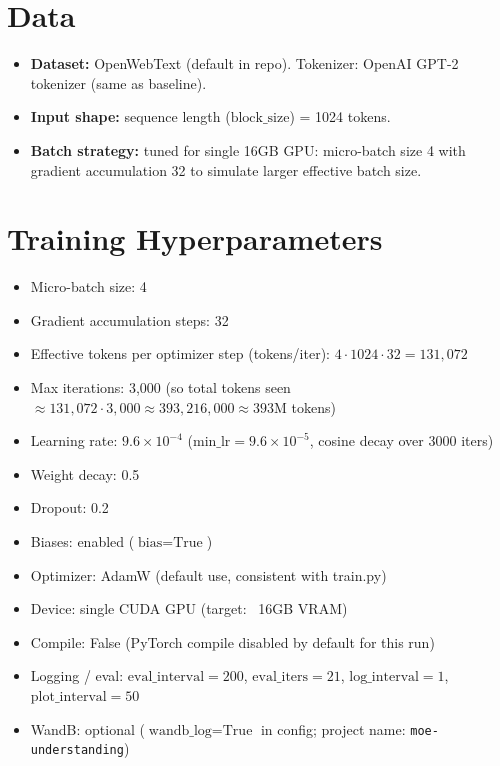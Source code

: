 \documentclass{article}
\begin{document}
\section{Data}
\begin{itemize}
    \item \textbf{Dataset:} OpenWebText (default in repo). Tokenizer: OpenAI GPT-2 tokenizer (same as baseline).
    \item \textbf{Input shape:} sequence length ($\text{block\_size}$) = 1024 tokens.
    \item \textbf{Batch strategy:} tuned for single 16GB GPU: micro-batch size 4 with gradient accumulation 32 to simulate larger effective batch size.
\end{itemize}

\section{Training Hyperparameters}
\begin{itemize}
    \item Micro-batch size: 4
    \item Gradient accumulation steps: 32
    \item Effective tokens per optimizer step (tokens/iter): $4 \cdot 1024 \cdot 32 = 131,072$
    \item Max iterations: 3,000 (so total tokens seen $\approx 131,072 \cdot 3,000 \approx 393,216,000 \approx 393$M tokens)
    \item Learning rate: $9.6 \times 10^{-4}$ ($\text{min\_lr} = 9.6 \times 10^{-5}$, cosine decay over 3000 iters)
    \item Weight decay: 0.5
    \item Dropout: 0.2
    \item Biases: enabled ($\text{bias}=\text{True}$)
    \item Optimizer: AdamW (default use, consistent with train.py)
    \item Device: single CUDA GPU (target: ~16GB VRAM)
    \item Compile: False (PyTorch compile disabled by default for this run)
    \item Logging / eval: $\text{eval\_interval} = 200$, $\text{eval\_iters} = 21$, $\text{log\_interval} = 1$, $\text{plot\_interval} = 50$
    \item WandB: optional ($\text{wandb\_log}=\text{True}$ in config; project name: \texttt{moe-understanding})
\end{itemize}
\end{document}
